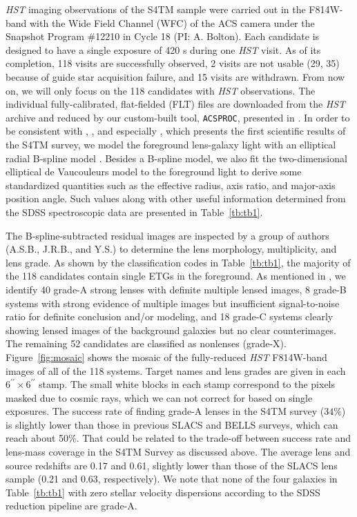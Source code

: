 \documentclass{emulateapj}
\begin{document}
\textsl{HST} imaging observations of the S4TM sample were carried out in the F814W-band with 
the Wide Field Channel (WFC) of the ACS camera under the Snapshot Program 
\#12210 in Cycle 18 (PI: A. Bolton). Each candidate is designed to have a single exposure 
of 420 s during one \textsl{HST} visit. As of its completion, 118 visits are successfully 
observed, 2 visits are not usable (29, 35) because of guide star acquisition failure, 
and 15 visits are withdrawn. From now on, we will only focus on the 118 candidates with 
\textsl{HST} observations. 
The individual fully-calibrated, flat-fielded (FLT) files are downloaded from the \textsl{HST} 
archive and reduced by our custom-built tool, {\tt ACSPROC}, presented in 
\citet{Brownstein12}. 
In order to be consistent with \citet{SLACSV}, \citet{Brownstein12}, 
and especially \citet{Shu15}, which presents the first scientific results of the S4TM survey, 
we model the foreground lens-galaxy light with an elliptical radial B-spline model 
\citep{SLACSI}. Besides a B-spline model, we also fit the two-dimensional elliptical 
de Vaucouleurs model \citep{deVaucouleurs48} 
to the foreground light to derive some standardized quantities such as the effective radius, 
axis ratio, and major-axis position angle. Such values along with other useful information 
determined from the SDSS spectroscopic data are presented in Table~\ref{tb:tb1}. 

The B-spline-subtracted residual images are inspected by a group of authors (A.S.B., 
J.R.B., and Y.S.) to determine the lens morphology, multiplicity, and lens grade. 
As shown by the classification codes in Table~\ref{tb:tb1}, the majority of the 118 
candidates contain single ETGs in the foreground. 
As mentioned in \citet{Shu15}, we identify 40 grade-A strong lenses with 
definite multiple lensed images, 8 grade-B systems with strong evidence of multiple images 
but insufficient signal-to-noise ratio for definite conclusion and/or modeling, 
and 18 grade-C systems clearly showing lensed images of the background galaxies but no clear 
counterimages. The remaining 52 candidates are classified as nonlenses (grade-X). 
Figure~\ref{fig:mosaic} shows the mosaic of the fully-reduced \textsl{HST} F814W-band images 
of all of the 118 systems. Target names and lens grades are given in each 
$6^{\prime \prime} \times 6^{\prime \prime}$ stamp. The small white blocks in each stamp 
correspond to the pixels masked due to cosmic rays, which we can not correct for 
based on single exposures. 
The success rate of finding grade-A lenses in the S4TM survey ($34\%$) is 
slightly lower than those in previous SLACS and BELLS surveys, which can reach about 50\%. 
That could be related to the trade-off between success rate and lens-mass coverage in the 
S4TM Survey as discussed above. 
The average lens and source redshifts are 0.17 and 0.61, slightly lower than those of 
the SLACS lens sample (0.21 and 0.63, respectively). We note that none of the four galaxies 
in Table~\ref{tb:tb1} with zero stellar velocity dispersions according to the SDSS 
reduction pipeline are grade-A.  
\end{document}

